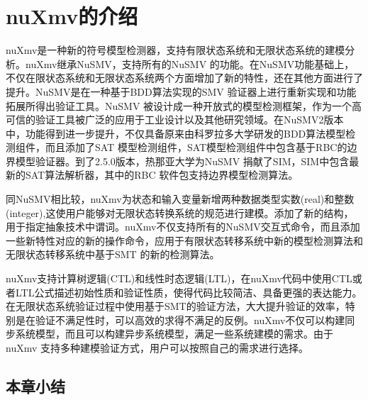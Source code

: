 
\chapter{nuXmv的介绍}
nuXmv是一种新的符号模型检测器，支持有限状态系统和无限状态系统的建模分析。nuXmv继承NuSMV，支持所有的NuSMV 的功能。在NuSMV功能基础上，不仅在限状态系统和无限状态系统两个方面增加了新的特性，还在其他方面进行了提升。NuSMV是在一种基于BDD算法实现的SMV 验证器上进行重新实现和功能拓展所得出验证工具。NuSMV 被设计成一种开放式的模型检测框架，作为一个高可信的验证工具被广泛的应用于工业设计以及其他研究领域。在NuSMV2版本中，功能得到进一步提升，不仅具备原来由科罗拉多大学研发的BDD算法模型检测组件，而且添加了SAT 模型检测组件，SAT模型检测组件中包含基于RBC的边界模型验证器。到了2.5.0版本，热那亚大学为NuSMV 捐献了SIM，SIM中包含最新的SAT算法解析器，其中的RBC 软件包支持边界模型检测算法。

同NuSMV相比较，nuXmv为状态和输入变量新增两种数据类型实数(real)和整数(integer),这使用户能够对无限状态转换系统的规范进行建模。添加了新的结构，用于指定抽象技术中谓词。nuXmv不仅支持所有的NuSMV交互式命令，而且添加一些新特性对应的新的操作命令，应用于有限状态转移系统中新的模型检测算法和无限状态转移系统中基于SMT 的新的检测算法。

nuXmv支持计算树逻辑(CTL)和线性时态逻辑(LTL)，在nuXmv代码中使用CTL或者LTL公式描述初始性质和验证性质，使得代码比较简洁、具备更强的表达能力。在无限状态系统验证过程中使用基于SMT的验证方法，大大提升验证的效率，特别是在验证不满足性时，可以高效的求得不满足的反例。nuXmv不仅可以构建同步系统模型，而且可以构建异步系统模型，满足一些系统建模的需求。由于nuXmv 支持多种建模验证方式，用户可以按照自己的需求进行选择。

\section{}



\section{本章小结}